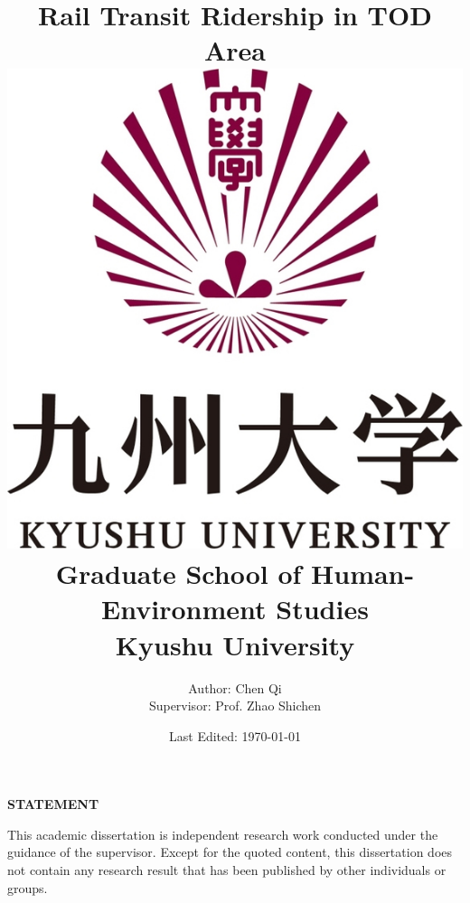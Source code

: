 \documentclass[12pt, twoside, a4paper]{book} %
\begin{document}
\title{
	{\Huge Rail Transit Ridership in TOD Area}\\
	{\vspace{3cm}}
	{\includegraphics[scale=0.2]{university.jpg}}\\
	{\vspace{2cm}}
	{\large Graduate School of Human-Environment Studies}\\
	{\large Kyushu University}
}
\author{
	{\large Author: Chen Qi}\\
	{\large Supervisor: Prof. Zhao Shichen}
	{\vspace{1cm}}
}
\date{\normalsize Last Edited: \today}
\maketitle

\centerline{\textbf{\Large STATEMENT}}

This academic dissertation is independent research work conducted under the guidance of the supervisor. Except for the quoted content, this dissertation does not contain any research result that has been published by other individuals or groups.\\
\newline
\newline
\end{document}
